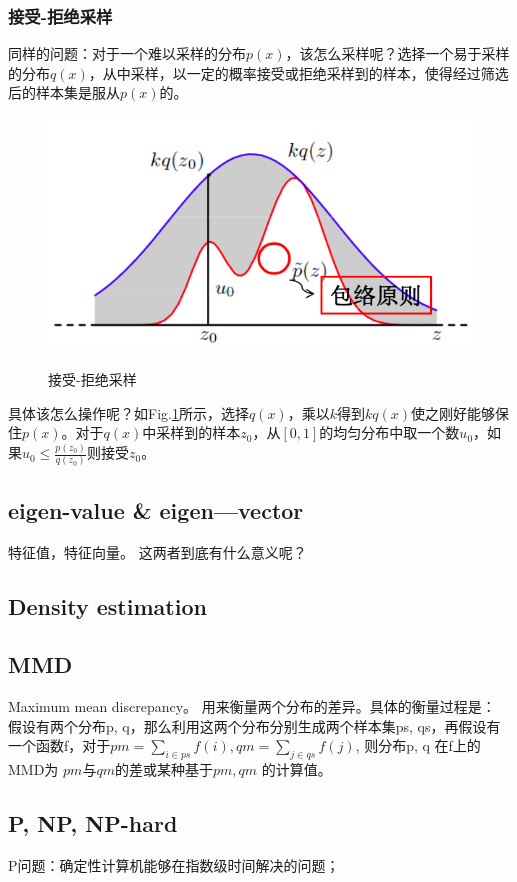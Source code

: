 \subsubsection{接受-拒绝采样}
同样的问题：对于一个难以采样的分布$p(x)$，该怎么采样呢？选择一个易于采样的分布$q(x)$，从中采样，以一定的概率接受或拒绝采样到的样本，使得经过筛选后的样本集是服从$p(x)$的。
\begin{figure}[h]
	\centering
	\includegraphics[width=.6\textwidth]{pics/accept-reject-sample.png}
	\label{fig:accept-reject-sample}
	\caption{接受-拒绝采样}
\end{figure}
具体该怎么操作呢？如Fig.\ref{fig:accept-reject-sample}所示，选择$q(x)$，乘以$k$得到$kq(x)$使之刚好能够保住$p(x)$。对于$q(x)$中采样到的样本$z_0$，从$[0, 1]$的均匀分布中取一个数$u_0$，如果$u_0 \le \frac{p(z_0)}{q(z_0)}$则接受$z_0$。

\subsection{eigen-value \& eigen—vector }
特征值，特征向量。
这两者到底有什么意义呢？


\subsection{Density estimation }

\subsection{MMD}
Maximum mean discrepancy。 用来衡量两个分布的差异。具体的衡量过程是：
假设有两个分布p, q，那么利用这两个分布分别生成两个样本集ps, qs，再假设有一个函数f，对于$pm = \sum_{i \in ps}f(i), qm = \sum_{j \in qs}f(j) $,
则分布p, q 在f上的MMD为 $pm$与$qm$的差或某种基于$pm, qm$ 的计算值。

\subsection{P, NP, NP-hard}
P问题：确定性计算机能够在指数级时间解决的问题；

